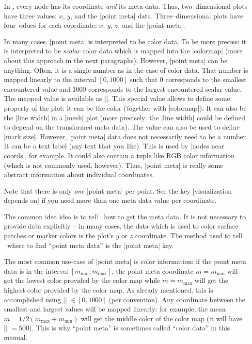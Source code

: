In \PGFPlots, every node has its coordinate \emph{and} its meta data. Thus, two--dimensional plots have three values: $x$, $y$, and the |point meta| data. Three--dimensional plots have four values for each coordinate: $x$, $y$, $z$, and the |point meta|. 

In many cases, |point meta| is interpreted to be color data. To be more precise: it is interpreted to be \emph{scalar} color data which is mapped into the |colormap| (more about this approach in the next paragraphs). However, |point meta| can be anything. Often, it is a single number as in the case of color data. That number is mapped linearly to the interval $[0,1000]$ such that $0$ corresponds to the smallest encountered value and $1000$ corresponds to the largest encountered scalar value. The mapped value is available as |\pgfplotspointmetatransformed|. This special value allows to define some property of the plot: it can be the color (together with |colormap|). It can also be the |line width| in a |mesh| plot (more precisely: the |line width| could be defined to depend on the transformed meta data). The value can also be used to define |mark size|. However, |point meta| data does not necessarily need to be a number. It can be a text label (any text that you like). This is used by |nodes near coords|, for example. It could also contain a tuple like RGB color information (which is not commonly used, however). Thus, |point meta| is really some abstract information about individual coordinates.

Note that there is only \emph{one} |point meta| per point. See the key |visualization depends on| if you need more than one meta data value per coordinate. 

The common idea idea is to tell \PGFPlots\ how to get the meta data. It is not necessary to provide data explicitly -- in many cases, the data which is used to color surface patches or marker colors is the plot's $y$ or $z$ coordinate. The method used to tell \PGFPlots\ where to find ``point meta data'' is the |point meta| key. 

The most common use-case of |point meta| is color information: if the point meta data is in the interval $[m_{\text{min}},m_{\text{max}}]$, the point meta coordinate $m = m_{\text{min}}$ will get the lowest color provided by the color map while $m=m_{\text{max}}$ will get the highest color provided by the color map. As already mentioned, this is accomplished using |\pgfplotspointmetatransformed| $\in [0,1000]$ (per convention). Any coordinate between the smallest and largest values will be mapped linearly: for example, the mean $m = 1/2 (m_{\text{max}} + m_{\text{min}})$ will get the middle color of the color map (it will have |\pgfplotspointmetatransformed| $=500$). This is why ``point meta'' is sometimes called ``color data'' in this manual.

